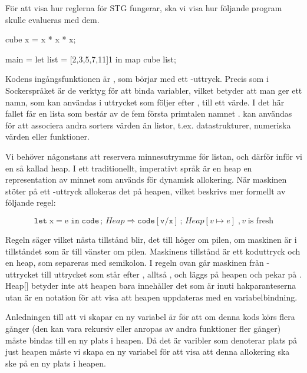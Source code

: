 \documentclass[../Core]{subfiles}
\begin{document}


För att visa hur reglerna
för STG  fungerar, ska vi visa hur följande program skulle evalueras med dem.

\begin{codeEx}
cube x = x * x * x;

main = let list = [2,3,5,7,11]1
        in map cube list;
\end{codeEx}

Kodens ingångsfunktionen är , som börjar med ett -uttryck.
Precis som i Sockerspråket är de verktyg för att binda variabler, vilket betyder att man ger ett
namn, som kan användas i uttrycket som följer efter ,
till ett värde. I det här fallet får
en lista som består av de fem första primtalen namnet .
 kan användas för att associera andra sorters värden än listor,
t.ex. datastrukturer, numeriska värden eller funktioner.

Vi behöver någonstans att reservera minnesutrymme för listan, och därför
inför vi en så kallad heap. I ett traditionellt, imperativt språk är
en heap en representation av minnet som används för dynamisk allokering. När
maskinen stöter på ett -uttryck allokeras det på heapen, vilket
beskrivs mer formellt av följande regel:

\[
\mathtt{let\;\mathrm{x\mathtt{=}e}\; in\; code}\,;\, Heap\Rightarrow\mathtt{code[v/x]}\,;\, Heap[v\mapsto e] \;, v\; \textrm{is fresh}
\]

Regeln säger vilket nästa tillstånd blir, det till höger om pilen,
om maskinen är i tillståndet som är till vänster om pilen.
Maskinens tillstånd är ett koduttryck och en heap, som separeras med
semikolon. I regeln ovan går maskinen från -uttrycket till
uttrycket som står efter , alltså ,
och  läggs på heapen och pekar på .
Heap{[}{]} betyder inte att heapen bara innehåller det som är inuti
hakparanteserna utan är en notation för att visa att heapen
uppdateras med en variabelbindning.

Anledningen till att vi skapar en ny variabel  är för att om
denna kods körs flera gånger (den kan vara rekursiv eller anropas av andra funktioner
fler gånger) måste  bindas till en ny plats i heapen. Då det är varibler som
denoterar plats på just heapen måste vi skapa en ny variabel för att visa att denna
allokering ska ske på en ny plats i heapen.
\end{document}
